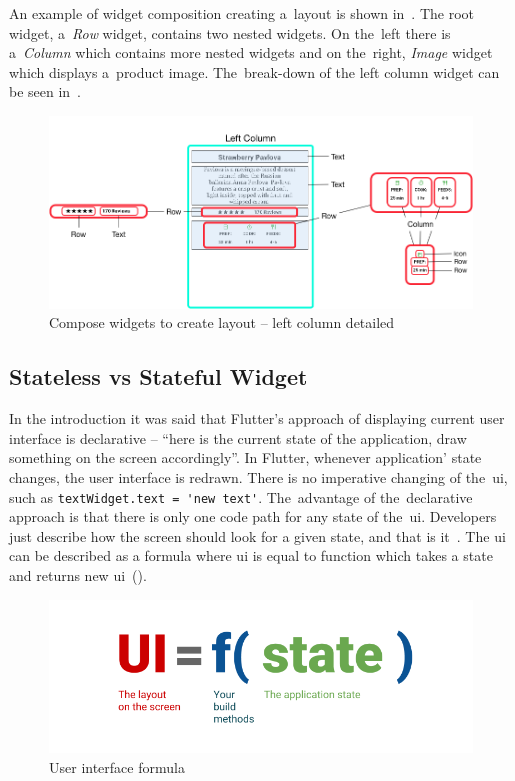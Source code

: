 An example of widget composition creating a~layout is shown in~. The root widget, a~\textit{Row} widget, contains two nested widgets. On the~left there is a~\textit{Column} which contains more nested widgets and on the~right, \textit{Image} widget which displays a~product image. The~break-down of the left column widget can be seen in~. 

\begin{figure}[htp]
    \centering
    \includegraphics[width=0.9\linewidth]{img/flutter/layout_compose_detail.png}
    \caption{Compose widgets to create layout -- left column detailed~\cite{flutter-widget-layout}}
    \label{fig:flutter-compose-widget-detail}
\end{figure}
\subsection{Stateless vs Stateful Widget}
In the introduction it was said that Flutter's approach of displaying current user interface is declarative -- ``here is the current state of the application, draw something on the screen accordingly''.  In Flutter, whenever application' state changes, the user interface is redrawn. There is no imperative changing of the~\gls{ui}, such as \verb|textWidget.text = 'new text'|. The~advantage of the~declarative approach is that there is only one code path for any state of the~\gls{ui}. Developers just describe how the screen should look for a given state, and that is it~\cite{flutter-declarative}. The \gls{ui} can be described as a formula where \gls{ui} is equal to function which takes a state and returns new \gls{ui}~().

\begin{figure}[htp]
    \centering
    \includegraphics[width=0.6\linewidth]{img/flutter/ui_f_state.png}
    \caption{User interface formula~\cite{flutter-declarative}}
    \label{fig:flutter-ui-formula}
\end{figure}
